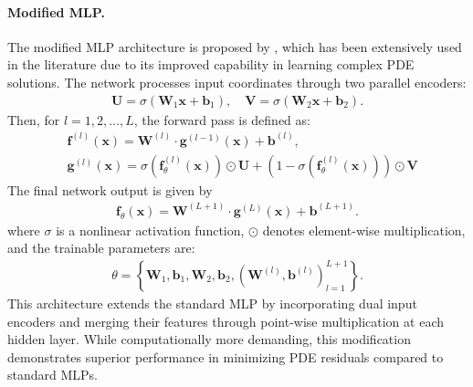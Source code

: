 \paragraph{Modified MLP.} The modified MLP architecture is proposed by \cite{wang2021understanding}, which has been extensively used in the literature \cite{daw2022rethinking,wang2022respecting, anagnostopoulos2023residual,chen2024self,karakonstantis2024room,zhangphysics} due to its improved capability in learning complex PDE solutions. The network processes input coordinates through two parallel encoders:
\begin{align}
    \mathbf{U}=\sigma\left(\mathbf{W}_1 \mathbf{x}+\mathbf{b}_1\right), \quad \mathbf{V}=\sigma\left(\mathbf{W}_2 \mathbf{x}+\mathbf{b}_2\right).
\end{align}
Then, for $l=1,2, \ldots, L$, the forward pass is defined as:
\begin{align}
    & \mathbf{f}^{(l)}(\mathbf{x})=\mathbf{W}^{(l)} \cdot \mathbf{g}^{(l-1)}(\mathbf{x})+\mathbf{b}^{(l)}, \\
& \mathbf{g}^{(l)}(\mathbf{x})=\sigma\left(\mathbf{f}_\theta^{(l)}(\mathbf{x})\right) \odot \mathbf{U}+\left(1-\sigma\left(\mathbf{f}_\theta^{(l)}(\mathbf{x})\right)\right) \odot \mathbf{V}
\end{align}
The final network output is given by
\begin{align}
    \mathbf{f}_\theta(\mathbf{x})=\mathbf{W}^{(L+1)} \cdot \mathbf{g}^{(L)}(\mathbf{x})+\mathbf{b}^{(L+1)}.
\end{align}
where $\sigma$ is a nonlinear activation function, $\odot$ denotes element-wise multiplication, and the trainable parameters are:
\begin{align}
    \theta=\left\{\mathbf{W}_1, \mathbf{b}_1, \mathbf{W}_2, \mathbf{b}_2,\left(\mathbf{W}^{(l)}, \mathbf{b}^{(l)}\right)_{l=1}^{L+1}\right\}.
\end{align}
This architecture extends the standard MLP by incorporating dual input encoders and merging their features through point-wise multiplication at each hidden layer. While computationally more demanding, this modification demonstrates superior performance in minimizing PDE residuals compared to standard MLPs.

